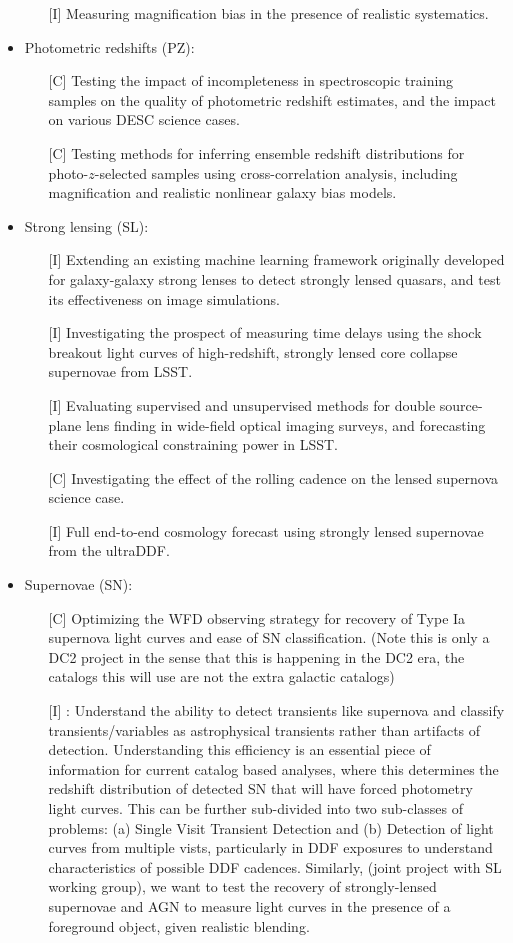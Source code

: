 \documentclass[preprint,times]{aastex61}
\begin{document}
\begin{itemize}
\begin{enumerate}
\item[{[I]}] Measuring magnification bias in the presence of realistic systematics.
\end{enumerate}
\item Photometric redshifts (PZ):
\begin{enumerate}
\item[{[C]}] Testing the impact of incompleteness in spectroscopic training samples on the quality of photometric redshift estimates, and the impact on various DESC science cases.
\item[{[C]}] Testing methods for inferring ensemble redshift distributions for photo-$z$-selected samples using cross-correlation analysis, including magnification and realistic nonlinear galaxy bias models.
\end{enumerate}
\item Strong lensing (SL):
\begin{enumerate}
\item[{[I]}] Extending an existing machine learning framework originally developed for galaxy-galaxy strong lenses to detect strongly lensed quasars, and test its effectiveness on image simulations.
\item[{[I]}] Investigating the prospect of measuring time delays using the shock breakout light curves of  high-redshift, strongly lensed core collapse supernovae from LSST.
\item[{[I]}] Evaluating supervised and unsupervised methods for double source-plane lens finding in wide-field optical imaging surveys, and forecasting their cosmological constraining power in LSST.
\item[{[C]}] Investigating the effect of the rolling cadence on the lensed supernova science case.
\item[{[I]}]  Full end-to-end cosmology forecast using strongly lensed supernovae from the ultraDDF.
\end{enumerate}
\item Supernovae (SN):
\begin{enumerate}
\item[{[C]}] Optimizing the WFD observing strategy for recovery of Type Ia supernova light curves and ease of SN classification. (Note this is only a DC2 project in the sense that this is happening in the DC2 era, the catalogs this will use are not the extra galactic catalogs)
\item[{[I]}] : Understand the ability to detect transients like supernova and classify transients/variables as astrophysical transients rather than artifacts of detection. Understanding this efficiency is an essential piece of information for current catalog based analyses, where this determines the redshift distribution of detected SN that will have forced photometry light curves. This can be further sub-divided into two sub-classes of problems: (a) Single Visit Transient Detection  and (b) Detection of light curves from multiple vists, particularly in DDF exposures to understand characteristics of possible DDF cadences. Similarly, (joint project with SL working group), we want to test the recovery of strongly-lensed supernovae and AGN to measure light curves in the presence of a foreground object, given realistic blending. 

\end{enumerate}
\end{itemize}
\end{document}
